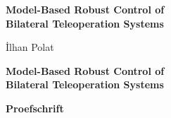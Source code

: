 
\newcommand{\thetitle}{Model-Based Robust Control of \\[2mm] Bilateral Teleoperation Systems}
\newcommand{\thesubtitle}{}  
\renewcommand{\theauthor}{İlhan Polat}
\vspace*{30mm}

\thispagestyle{empty}
\begin{center}
    \textbf{\huge \thetitle}\\[\baselineskip]\textbf{\LARGE \thesubtitle}
\end{center}

\vspace{20mm}
\begin{center}
    \Large\theauthor
\end{center}
\newpage

\thispagestyle{empty}

%
\vspace*{\fill}{\tiny .}
%
\newpage
\thispagestyle{empty}
\vspace*{30mm}

\begin{center}
     \textbf{\huge \thetitle}
\end{center}

\vspace{30mm}

\begin{center}
    \textbf{Proefschrift}
\end{center}

